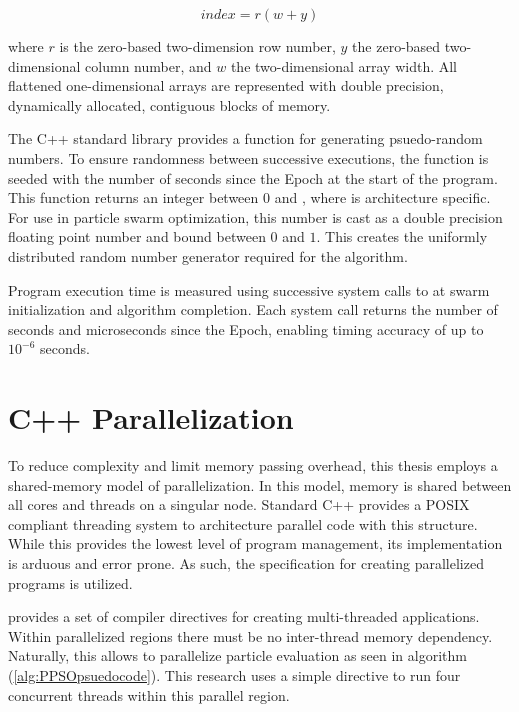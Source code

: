 \begin{equation}
    index = r(w+y)
    \label{eq:index-conversion}
\end{equation}

\noindent where $r$ is the zero-based two-dimension row number, $y$ the zero-based two-dimensional column number, and $w$ the two-dimensional array width. All flattened one-dimensional arrays are represented with double precision, dynamically allocated, contiguous blocks
of memory. \newline

\noindent
The C++ standard library provides a  function for generating psuedo-random numbers.
To ensure randomness between successive executions, the  function is seeded with the number
of seconds since the Epoch at the start of the program. This function returns an integer 
between $0$ and , where  is architecture specific. 
For use in particle swarm optimization, this number is cast as a double
precision floating point number and bound between $0$ and $1$. This creates the uniformly distributed
random number generator required for the algorithm. \newline

\noindent Program execution time is measured using successive system calls to 
at swarm initialization and algorithm completion. Each system call returns the number of seconds
and microseconds since the Epoch, enabling timing accuracy of up to $10^{-6}$ seconds.

\section{C++ Parallelization}
\noindent To reduce complexity and limit memory passing overhead, this thesis employs a shared-memory model of 
parallelization. In this model, memory is shared between all cores and threads on a singular node.
Standard C++ provides a POSIX compliant threading system to architecture parallel code with this structure. While this provides 
the lowest level of program management, its implementation is arduous and error prone. As such, the 
specification for creating parallelized programs is utilized. \newline

\noindent {} provides a set of compiler directives for creating multi-threaded applications. Within parallelized
regions there must be no inter-thread memory dependency. Naturally, this allows  to parallelize particle
evaluation as seen in algorithm (\ref{alg:PPSOpsuedocode}). This research uses a simple    directive to
run four concurrent threads within this parallel region.
\newpage